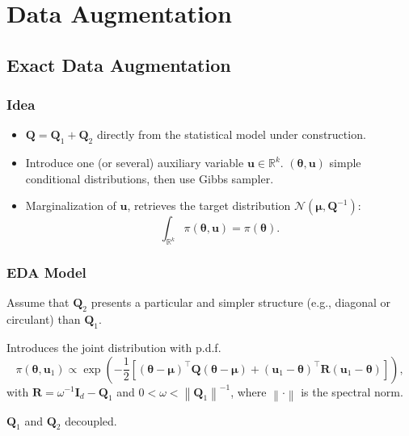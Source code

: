 \documentclass[aspectratio=169]{beamer}
\newcommand{\B}[1]{\mathbf{#1}} %
\newcommand{\Bs}[1]{\boldsymbol{#1}} %
\newcommand{\pr}[1]{\left(#1\right)} %
\newcommand{\br}[1]{\left[#1\right]} %
\newcommand{\nr}[1]{\left\|#1\right\|} %
\begin{document}

\section{Data Augmentation}
\subsection{Exact Data Augmentation}
\begin{frame}
\frametitle{Idea}
\begin{itemize}
\item \(\B{Q} = \B{Q}_1 + \B{Q}_2\) directly from the statistical model under construction.
\item Introduce one (or several) auxiliary variable $\B{u} \in \mathbb{R}^k$. $(\Bs{\theta},\B{u})$ simple conditional distributions, then use Gibbs sampler.
\item Marginalization of $\B{u}$, retrieves the target distribution $\mathcal{N}(\Bs{\mu},\B{Q}^{-1})$: \[\int_{\mathbb{R}^k} \pi(\Bs{\theta},\B{u}) = \pi(\Bs{\theta}).\]
\end{itemize}
\end{frame}

\begin{frame}
\frametitle{EDA Model}
  Assume that $\B{Q}_2$ presents a particular and simpler structure (e.g., diagonal or circulant) than $\B{Q}_1$. 

  Introduces the joint distribution with p.d.f.
\[
    \pi(\Bs{\theta},\B{u}_1) \propto \exp\pr{-\dfrac{1}{2}\br{(\Bs{\theta}-\Bs{\mu})^{\top}\B{Q}(\Bs{\theta}-\Bs{\mu}) + (\B{u}_1-\Bs{\theta})^{\top}\B{R}(\B{u}_1-\Bs{\theta})}},
\]
  with $\B{R} = \omega^{-1}\B{I}_d - \B{Q}_1$ and $0< \omega < \nr{\B{Q}_1}^{-1}$, where $\nr{\cdot}$ is the spectral norm. 
  
$\B{Q}_1$ and $\B{Q}_2$ decoupled.
\end{frame}
\end{document}

